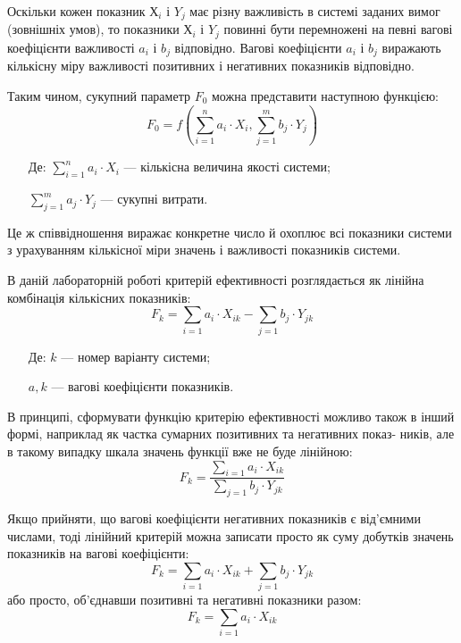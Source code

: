 Оскільки кожен показник $Х_i$ і $Y_j$ має різну важливість в системі заданих вимог (зовнішніх умов),
то показники $Х_i$ і $Y_j$ повинні бути перемножені на певні вагові коефіцієнти важливості $a_i$ і
$b_j$ відповідно. Вагові коефіцієнти $a_i$ і $b_j$ виражають кількісну міру важливості позитивних і
негативних показників відповідно.

Таким чином, сукупний параметр $F_0$ можна представити наступною функцією:
\begin{equation}
  \label{eq:sum_param} F_0 = f(\displaystyle\sum_{i=1}^{n} a_i \cdot X_i, \displaystyle\sum_{j=1}^{m}
b_j \cdot Y_j)
\end{equation}
\begin{itemize}[labelsep=*]
\item [Де:] $\displaystyle\sum_{i=1}^{n} a_i \cdot X_i$ --- кількісна величина якості системи;
\item []$\displaystyle\sum_{j=1}^{m} a_j \cdot Y_j$ --- сукупні витрати.
\end{itemize}

Це ж співвідношення виражає конкретне число й охоплює всі показники системи з урахуванням кількісної
міри значень і важливості показників системи.

В даній лабораторній роботі критерій ефективності розглядається як лінійна комбінація кількісних
показників:
\begin{equation}
  \label{eq:quanitiy_factor}
  F_k = \displaystyle\sum_{i=1} a_i \cdot X_{ik} - \displaystyle\sum_{j=1} b_j \cdot Y_{jk}
\end{equation}
\begin{itemize}[labelsep=*]
\item [Де:] $k$ --- номер варіанту системи;
\item [] $a,k$ --- вагові коефіцієнти показників.
\end{itemize}

В принципі, сформувати функцію критерію ефективності можливо також в інший формі, наприклад як
частка сумарних позитивних та негативних показ- ників, але в такому випадку шкала значень функції
вже не буде лінійною:
\begin{equation}
  \label{eq:quanity_factor_alternative}
  F_k = \frac{\displaystyle\sum_{i=1} a_i \cdot X_{ik}}{\displaystyle\sum_{j=1} b_j \cdot Y_{jk}}  
\end{equation}

Якщо прийняти, що вагові коефіцієнти негативних показників є від’ємними числами, тоді лінійний
критерій можна записати просто як суму добутків значень показників на вагові коефіцієнти:
\begin{equation}
  \label{eq:quanity_factor_linear}
  F_k = \displaystyle\sum_{i=1} a_i \cdot X_{ik} + \displaystyle\sum_{j=1} b_j \cdot Y_{jk}
\end{equation}
або просто, об’єднавши позитивні та негативні показники разом:
\begin{equation}
  \label{eq:quanity_factor_simple}
  F_k = \displaystyle\sum_{i=1} a_i \cdot X_{ik}
\end{equation}

